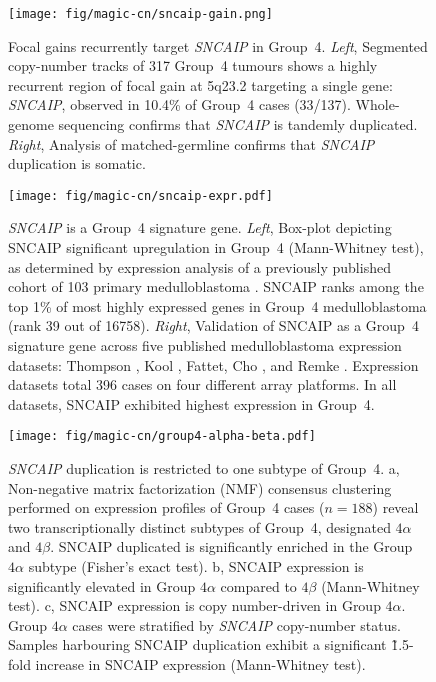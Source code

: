 \documentclass[11pt,letterpaper]{article}
\theoremstyle{definition}
\begin{document}
\clearpage

\begin{figure}[h]
	\begin{center}
		\texttt{[image: fig/magic-cn/sncaip-gain.png]}
	\end{center}
	\caption[Focal gains recurrently target \emph{SNCAIP} in Group~4]
	{
	Focal gains recurrently target \emph{SNCAIP} in Group~4.
	\emph{Left}, Segmented copy-number tracks of 317 Group~4 tumours shows a highly recurrent region of focal gain at 5q23.2 targeting a single gene: \emph{SNCAIP}, observed in 10.4\% of Group~4 cases (33/137). Whole-genome sequencing confirms that \emph{SNCAIP} is tandemly duplicated. \emph{Right}, Analysis of matched-germline confirms that \emph{SNCAIP} duplication is somatic.
	}
	\label{fig:sncaip-gain}
\end{figure}

\begin{figure}[h]
	\begin{center}
		\texttt{[image: fig/magic-cn/sncaip-expr.pdf]}
	\end{center}
	\caption[\emph{SNCAIP} is a Group~4 signature gene]
	{
	\emph{SNCAIP} is a Group~4 signature gene.
	\emph{Left}, Box-plot depicting SNCAIP significant upregulation in Group~4 (Mann-Whitney test), as determined by expression analysis of a previously published cohort of 103 primary medulloblastoma . SNCAIP ranks among the top 1\% of most highly expressed genes in Group~4 medulloblastoma (rank 39 out of 16758).
	\emph{Right}, Validation of SNCAIP as a Group~4 signature gene across five published medulloblastoma expression datasets: Thompson , Kool , Fattet, Cho , and Remke . Expression datasets total 396 cases on four different array platforms. In all datasets, SNCAIP exhibited highest expression in Group~4.
	}
	\label{fig:sncaip-expr}
\end{figure}

\begin{figure}[h]
	\begin{center}
		\texttt{[image: fig/magic-cn/group4-alpha-beta.pdf]}
	\end{center}
	\caption[\emph{SNCAIP} duplication is restricted to one subtype of Group~4]
	{
	\emph{SNCAIP} duplication is restricted to one subtype of Group~4.
	\textsf{a}, Non-negative matrix factorization (NMF) consensus clustering performed on expression profiles of Group~4 cases ($n = 188$) reveal two transcriptionally distinct subtypes of Group~4, designated $4\alpha$ and $4\beta$. SNCAIP duplicated is significantly enriched in the Group $4\alpha$ subtype (Fisher's exact test).
	\textsf{b}, SNCAIP expression is significantly elevated in Group $4\alpha$ compared to $4\beta$ (Mann-Whitney test).
	\textsf{c}, SNCAIP expression is copy number-driven in Group $4\alpha$. Group $4\alpha$ cases were stratified by \emph{SNCAIP} copy-number status. Samples harbouring SNCAIP duplication exhibit a significant \~1.5-fold increase in SNCAIP expression (Mann-Whitney test).
	}
	\label{fig:group4-alpha-beta}
\end{figure}
\end{document}
